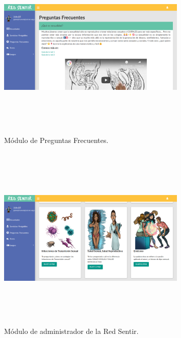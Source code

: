 \documentclass[a4paper]{article}
\begin{document}
\begin{figure}[t]
\centering
\includegraphics[width=0.8\textwidth,height=3.5in]{FAQ.png}
\caption{Módulo de Preguntas Frecuentes.}
\label{fig:FAQ}
\end{figure}

\begin{figure}[t]
\centering
\includegraphics[width=0.8\textwidth,height=3.5in]{foros.png}
\caption{Módulo de administrador de la Red Sentir.}
\label{fig:foros}
\end{figure}
\end{document}

